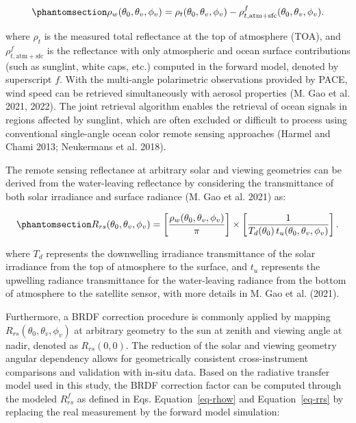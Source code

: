\documentclass[
  11pt,
  letterpaper,
  DIV=11,
  numbers=noendperiod]{scrreprt}
\begin{document}
\begin{equation}\phantomsection\label{eq-rhow}{
\rho_w(\theta_0,\theta_v,\phi_v)
=
\rho_t(\theta_0,\theta_v,\phi_v)
-
\rho^{f}_{t,\mathrm{atm+sfc}}(\theta_0,\theta_v,\phi_v).
}\end{equation}

where \(\rho_t\) is the measured total reflectance at the top of
atmosphere (TOA), and \(\rho^{f}_{t,\mathrm{atm+sfc}}\) is the
reflectance with only atmospheric and ocean surface contributions (such
as sunglint, white caps, etc.) computed in the forward model, denoted by
superscript \(f\). With the multi-angle polarimetric observations
provided by PACE, wind speed can be retrieved simultaneously with
aerosol properties (M. Gao et al. 2021, 2022). The joint retrieval
algorithm enables the retrieval of ocean signals in regions affected by
sunglint, which are often excluded or difficult to process using
conventional single-angle ocean color remote sensing approaches (Harmel
and Chami 2013; Neukermans et al. 2018).

The remote sensing reflectance at arbitrary solar and viewing geometries
can be derived from the water-leaving reflectance by considering the
transmittance of both solar irradiance and surface radiance (M. Gao et
al. 2021) as:

\begin{equation}\phantomsection\label{eq-rrs}{
R_{rs}(\theta_0,\theta_v,\phi_v)
=
\left[
\frac{\rho_w(\theta_0,\theta_v,\phi_v)}{\pi}
\right]
\times
\left[
\frac{1}
{T_d(\theta_0)\,t_u(\theta_0,\theta_v,\phi_v)}
\right].
}\end{equation}

where \(T_d\) represents the downwelling irradiance transmittance of the
solar irradiance from the top of atmosphere to the surface, and \(t_u\)
represents the upwelling radiance transmittance for the water-leaving
radiance from the bottom of atmosphere to the satellite sensor, with
more details in M. Gao et al. (2021).

Furthermore, a BRDF correction procedure is commonly applied by mapping
\(R_{rs}(\theta_0, \theta_v, \phi_v)\) at arbitrary geometry to the sun
at zenith and viewing angle at nadir, denoted as \(R_{rs}(0,0)\). The
reduction of the solar and viewing geometry angular dependency allows
for geometrically consistent cross-instrument comparisons and validation
with in-situ data. Based on the radiative transfer model used in this
study, the BRDF correction factor can be computed through the modeled
\(R_{rs}^f\) as defined in Eqs. Equation~\ref{eq-rhow} and
Equation~\ref{eq-rrs} by replacing the real measurement by the forward
model simulation:
\end{document}

